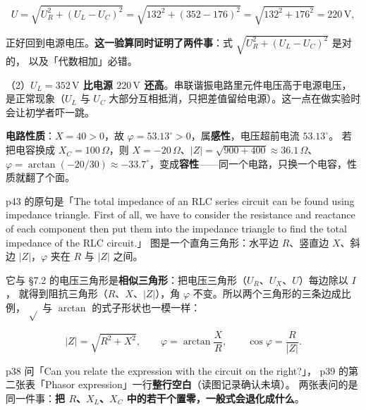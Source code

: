 \documentclass[11pt]{ctexart}
\begin{document}
\[ U=\sqrt{U_R^{2}+\left(U_L-U_C\right)^{2}}
   =\sqrt{132^{2}+\left(352-176\right)^{2}}
   =\sqrt{132^{2}+176^{2}}=220\,\mathrm{V} , \]

正好回到电源电压。\textbf{这一验算同时证明了两件事}：式 $\sqrt{U_R^2+(U_L-U_C)^2}$ 是对的，
以及「代数相加」必错。

（2）\textbf{$U_L=352\,\mathrm{V}$ 比电源 $220\,\mathrm{V}$ 还高}。串联谐振电路里元件电压高于电源电压，
是正常现象（$U_L$ 与 $U_C$ 大部分互相抵消，只把差值留给电源）。这一点在做实验时会让初学者吓一跳。

\textbf{电路性质}：$X=40>0$，故 $\varphi=53.13^\circ>0$，属\textbf{感性}，电压超前电流 $53.13^\circ$。
若把电容换成 $X_C=100\,\Omega$，则 $X=-20\,\Omega$、$|Z|=\sqrt{900+400}\approx36.1\,\Omega$、
$\varphi=\arctan(-20/30)\approx-33.7^\circ$，变成\textbf{容性}——同一个电路，只换一个电容，性质就翻了个面。


p43 的原句是「The total impedance of an RLC series circuit can be found using impedance triangle.
First of all, we have to consider the resistance and reactance of each component then put them into
the impedance triangle to find the total impedance of the RLC circuit.」
图是一个直角三角形：水平边 $R$、竖直边 $X$、斜边 $|Z|$，$\varphi$ 夹在 $R$ 与 $|Z|$ 之间。

它与 §7.2 的电压三角形是\textbf{相似三角形}：把电压三角形（$U_R$、$U_X$、$U$）每边除以 $I$，
就得到阻抗三角形（$R$、$X$、$|Z|$），角 $\varphi$ 不变。所以两个三角形的三条边成比例，
$\sqrt{}$ 与 $\arctan$ 的式子形状也一模一样：

\[ |Z|=\sqrt{R^{2}+X^{2}} ,\qquad \varphi=\arctan\frac{X}{R} ,\qquad
   \cos\varphi=\frac{R}{|Z|} . \]



p38 问「Can you relate the expression with the circuit on the right?」，
p39 的第二张表「Phasor expression」一行\textbf{整行空白}（读图记录确认未填）。
两张表问的是同一件事：\textbf{把 $R$、$X_L$、$X_C$ 中的若干个置零，一般式会退化成什么}。
\end{document}
